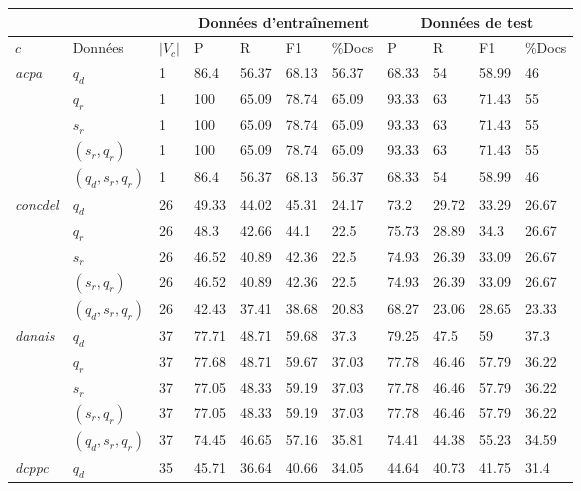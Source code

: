 \begin{table}[!htb]
	\centering \scriptsize
	\begin{tabular}{l|l|l|llll|llll}
			\hline
		&                 &                       &          \multicolumn{4}{c|}{Données d'entraînement}      &      \multicolumn{4}{c}{Données de test}       \\ \hline
		$c$ & Données & $\vert V_c \vert$ & P     & R     & F1                       & \%Docs & P     & R     & F1              & \%Docs \\ \hline
		\multirow{5}{*}{\textit{acpa}}  & $q_d$ & 1 & 86.4 & 56.37 & 68.13 & 56.37 & 68.33 & 54 & 58.99 & 46 \\
		& $q_r$ & 1 & 100 & 65.09 & 78.74 & 65.09 & 93.33 & 63 & 71.43 & 55 \\
		& $s_r$ & 1 & 100 & 65.09 & 78.74 & 65.09 & 93.33 & 63 & 71.43 & 55 \\
		& $(s_r, q_r)$ & 1 & 100 & 65.09 & 78.74 & 65.09 & 93.33 & 63 & 71.43 & 55 \\
		& $(q_d,s_r, q_r)$ & 1 & 86.4 & 56.37 & 68.13 & 56.37 & 68.33 & 54 & 58.99 & 46 \\ \hline
		\multirow{5}{*}{\textit{concdel}}  & $q_d$ & 26 & 49.33 & 44.02 & 45.31 & 24.17 & 73.2 & 29.72 & 33.29 & 26.67 \\
		& $q_r$ & 26 & 48.3 & 42.66 & 44.1 & 22.5 & 75.73 & 28.89 & 34.3 & 26.67 \\
		& $s_r$ & 26 & 46.52 & 40.89 & 42.36 & 22.5 & 74.93 & 26.39 & 33.09 & 26.67 \\
		& $(s_r, q_r)$ & 26 & 46.52 & 40.89 & 42.36 & 22.5 & 74.93 & 26.39 & 33.09 & 26.67 \\
		& $(q_d,s_r, q_r)$ & 26 & 42.43 & 37.41 & 38.68 & 20.83 & 68.27 & 23.06 & 28.65 & 23.33 \\ \hline
		\multirow{5}{*}{\textit{danais}} & $q_d$ & 37 & 77.71 & 48.71 & 59.68 & 37.3 & 79.25 & 47.5 & 59 & 37.3 \\
		& $q_r$ & 37 & 77.68 & 48.71 & 59.67 & 37.03 & 77.78 & 46.46 & 57.79 & 36.22 \\
		& $s_r$ & 37 & 77.05 & 48.33 & 59.19 & 37.03 & 77.78 & 46.46 & 57.79 & 36.22 \\
		& $(s_r, q_r)$ & 37 & 77.05 & 48.33 & 59.19 & 37.03 & 77.78 & 46.46 & 57.79 & 36.22 \\
		& $(q_d,s_r, q_r)$ & 37 & 74.45 & 46.65 & 57.16 & 35.81 & 74.41 & 44.38 & 55.23 & 34.59 \\ \hline
		\multirow{5}{*}{\textit{dcppc}}   & $q_d$ & 35 & 45.71 & 36.64 & 40.66 & 34.05 & 44.64 & 40.73 & 41.75 & 31.4 \\

\end{tabular}
\end{table}

